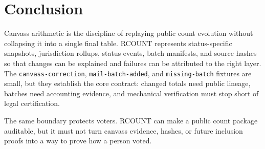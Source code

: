 \section{Conclusion}

Canvass arithmetic is the discipline of replaying public count evolution without
collapsing it into a single final table. RCOUNT represents status-specific
snapshots, jurisdiction rollups, status events, batch manifests, and source
hashes so that changes can be explained and failures can be attributed to the
right layer. The \texttt{canvass-correction}, \texttt{mail-batch-added}, and
\texttt{missing-batch} fixtures are small, but they establish the core contract:
changed totals need public lineage, batches need accounting evidence, and
mechanical verification must stop short of legal certification.

The same boundary protects voters. RCOUNT can make a public count package
auditable, but it must not turn canvass evidence, hashes, or future inclusion
proofs into a way to prove how a person voted.
